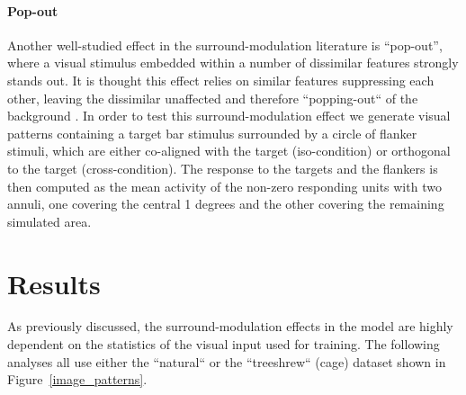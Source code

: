 \paragraph{Pop-out}

Another well-studied effect in the surround-modulation
literature is ``pop-out'', where a visual stimulus 
embedded within a number of dissimilar features strongly stands
out. It is thought this effect relies on similar features suppressing
each other, leaving the dissimilar unaffected and therefore
``popping-out`` of the background \citep{Kastner1997}. In order to
test this surround-modulation effect we generate visual patterns
containing a target bar stimulus surrounded by a circle of flanker
stimuli, which are either co-aligned with the target (iso-condition)
or orthogonal to the target (cross-condition).
The response to the targets and the flankers is then computed as the
mean activity of the non-zero responding units with two annuli, one
covering the central 1 degrees and the other covering the remaining
simulated area.

\section{Results}

As previously discussed, the surround-modulation effects in the model
are highly dependent on the statistics of the visual input used for
training. The following analyses all use either the ``natural`` or the
``treeshrew`` (cage) dataset shown in Figure~\ref{image_patterns}.

